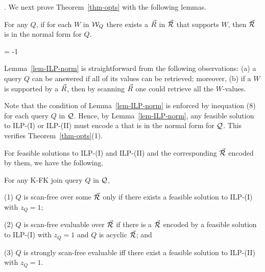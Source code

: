 \vspace{-0.4ex}

. We next prove Theorem~\ref{thm-opts} with the following lemmas. 



\begin{lemma}\label{lem-ILP-norm}
  For any \SQL $Q$, if for each \qcs $W$ in $\mathcal{W}_{Q}$ there
  exists a \bs $\vec{R}$ in $\vec{{\mathcal R}}$ that supports $W$, then
  $\vec{{\mathcal R}}$ is in the normal form for $Q$.
\end{lemma}
\looseness = -1

Lemma~\ref{lem-ILP-norm} is straightforward from the following observations:
(a) a query $Q$ can be answered if all of its \qcs values can be
retrieved; moreover,
(b) if a \qcs $W$ is supported by a \bs $\vec{R}$, then by scanning
$\vec{R}$ one could retrieve all the $W$-values. 

Note that the condition of Lemma~\ref{lem-ILP-norm} is enforced
by inequation (8) for each query $Q$ in $\mathcal Q$.
Hence, by Lemma~\ref{lem-ILP-norm}, any feasible solution to ILP-(I)
or ILP-(II) must encode a \bds that is in the normal form for $\mathcal Q$.
This verifies Theorem~\ref{thm-opts}(1). 


\vspace{1ex}
For feasible solutions to ILP-(I) and ILP-(II) and the
corresponding \bdss $\vec{{\mathcal R}}$ encoded by them,
we have the following.

\vspace{-0.5ex}
\begin{lemma}\label{lem-ILP}
  For any K-FK join \SPC query $Q$ in $\mathcal Q$, 

  \sstab (1) $Q$ is scan-free over some \bds $\vec{{\mathcal R}}$ only if there exists a feasible
  solution to ILP-(I) with $z_{Q} = 1$; 

  \sstab (2) $Q$ is scan-free evaluable over $\vec{{\mathcal R}}$
  if there is a \bds $\vec{{\mathcal R}}$ encoded by a feasible
  solution to ILP-(I) with $z_{Q} = 1$ and $Q$ is acyclic \wrt
  $\vec{{\mathcal R}}$; and

  \sstab (3) $Q$ is strongly scan-free evaluable iff there exist a
  feasible solution to ILP-(II) with $z_{Q} = 1$. 
\end{lemma}

\vspace{-0.7ex}


